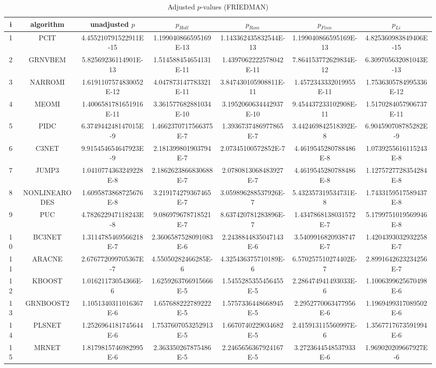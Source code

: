 \documentclass[a4paper,10pt]{article}
\begin{document}
\begin{landscape}
\begin{table}[!htp]
\centering\scriptsize
\caption{Adjusted $p$-values (FRIEDMAN)}
\begin{tabular}{ccccccc}
i&algorithm&unadjusted $p$&$p_{Holl}$&$p_{Rom}$&$p_{Finn}$&$p_{Li}$\\
\hline
1&PCIT&4.455210791522911E-15&1.199040866595169E-13&1.143362435832544E-13&1.199040866595169E-13&4.825360983849406E-15\\
2&GRNVBEM&5.82569236114901E-13&1.514588454654131E-11&1.4397062222578042E-11&7.864153772629834E-12&6.309705632081043E-13\\
3&NARROMI&1.6191107574830052E-12&4.047873147783321E-11&3.847430105908811E-11&1.4572343332019955E-11&1.7536305784995336E-12\\
4&MEOMI&1.4006581781651916E-11&3.361577682881034E-10&3.1952060634442937E-10&9.454437233102908E-11&1.5170284057906737E-11\\
5&PIDC&6.374944248147015E-9&1.4662370717566375E-7&1.3936737486977865E-7&3.442469842518392E-8&6.904590708785282E-9\\
6&C3NET&9.915454654647923E-9&2.181399801903794E-7&2.07345100572852E-7&4.4619545280788486E-8&1.0739255616115243E-8\\
7&JUMP3&1.0410774363249228E-8&2.1862623866830688E-7&2.0780813068483927E-7&4.4619545280788486E-8&1.1275727728354284E-8\\
8&NONLINEARODES&1.6095873868725676E-8&3.219174279367465E-7&3.059896288537926E-7&5.432357319534731E-8&1.7433159517589437E-8\\
9&PUC&4.782622947118243E-8&9.086979678718521E-7&8.637420781283896E-7&1.4347868138031572E-7&5.1799751019569946E-8\\
10&BC3NET&1.3114785469566218E-7&2.3606587528091083E-6&2.2438844835047143E-6&3.5409916820938747E-7&1.4204393032932258E-7\\
11&ARACNE&2.676772099705367E-7&4.55050282466285E-6&4.325436375710189E-6&6.570257510274402E-7&2.8991642623234256E-7\\
12&KBOOST&1.01621173054366E-6&1.6259263766915666E-5&1.5455285355456455E-5&2.286474941493033E-6&1.1006399625670498E-6\\
13&GRNBOOST2&1.1051340311016367E-6&1.657688222789222E-5&1.5757336448668945E-5&2.2952770063477956E-6&1.1969499317089502E-6\\
14&PLSNET&1.2526964181745644E-6&1.7537607053252913E-5&1.6670740229034682E-5&2.415913115560997E-6&1.3567717673591994E-6\\
15&MRNET&1.8179815746982995E-6&2.363350267875486E-5&2.2465656367924167E-5&3.2723644548537933E-6&1.969020209667927E-6\\

\end{tabular}
\end{table}
\end{landscape}
\end{document}
